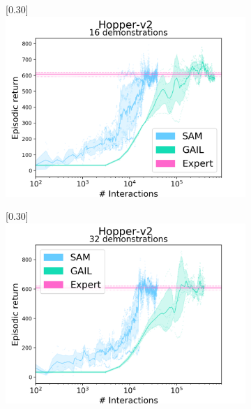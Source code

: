 \begin{figure}
\begin{subfigure}[t]{0.49\textwidth}
    \center\scalebox{0.30}[0.30]{\includegraphics{Plots/sam_gail_Hopper_s0-1-2-3_d16_results_log}}
  \end{subfigure}
  \begin{subfigure}[t]{0.49\textwidth}
    \center\scalebox{0.30}[0.30]{\includegraphics{Plots/sam_gail_Hopper_s0-1-2-3_d32_results_log}}
  \end{subfigure}
  \begin{subfigure}[t]{0.49\textwidth}

\end{subfigure}
\end{figure}
